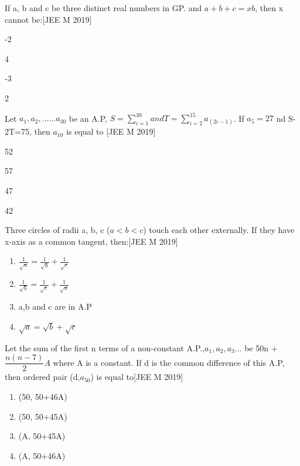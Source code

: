 \documentclass[journal,12pt,twocolumn]{IEEEtran}
\theoremstyle{remark}
\begin{document}
\begin{enumerate}
{  \item{If a, b and c be three distinct real numbers in GP. and $a+b+c=xb$, then x cannot be:\hfill{[JEE M 2019]}
\begin{enumerate}
  \begin{multicols}{2}
  \item {-2} \item{4}\columnbreak
  \item{-3}
  \item{2}
  \end{multicols}
  \end{enumerate}}
  \item {Let $a_{1},a_{2},......a_{30}$ be an A.P, $S=\sum_{i=1}^{30} and T=\sum_{i=2}^{15}a_{(2i-1)}$. If $a_{5}=27$
	  nd S-2T=75, then $a_{10}$ is equal to \hfill{[JEE M 2019]}
\begin{enumerate}
  \begin{multicols}{2}
  \item {52} \item{57}\columnbreak
  \item{47}
  \item{42}
  \end{multicols}
  \end{enumerate}}
\item{Three circles of radii a, b, c ($a<b<c$) touch each other externally. If they have x-axis as a common tangent, then:\hfill{[JEE M 2019]}\begin{enumerate} \itemsep.5em	
  
  \item {$\frac{1}{\sqrt{a}}=\frac{1}{\sqrt{b}}+\frac{1}{\sqrt{c}}$} 
  \item {$\frac{1}{\sqrt{b}}=\frac{1}{\sqrt{c}}+\frac{1}{\sqrt{a}}$} 
  \item{a,b and c are in A.P}
  \item{${\sqrt{a}}={\sqrt{b}}+{\sqrt{c}}$}
  \end{enumerate}} 
  \item{Let the sum of the first n terms of a non-constant A.P.,$a_{1},a_{2},a_{3}$... be 50n + $\dfrac{n(n-7)}{2}A$
	  where A is a constant. If d is the common difference of this A.P, then ordered pair (d,$a_{50}$) is equal to\hfill{[JEE M 2019]}} \vspace{.5em}\begin{enumerate}
		  \itemsep.5em  \item {(50, 50+46A)} \item{(50, 50+45A)}
  \item{(A, 50+45A)}
  \item{(A, 50+46A)}
  \end{enumerate}}
  \end{enumerate}
  
\end{document}
